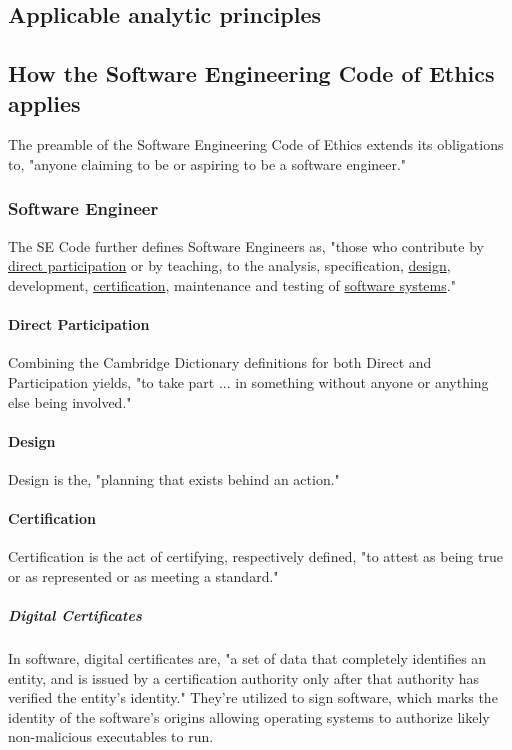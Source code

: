 \documentclass[12pt]{article}
\begin{document}
\begin{multicols}{2}
\section{Applicable analytic principles}

\subsection{How the Software Engineering Code of Ethics applies}

The preamble of the Software Engineering Code of Ethics extends its obligations to, "anyone claiming to be or aspiring to be a software engineer."\cite{softwareEngineeringCodeOfEthics}

\subsubsection{Software Engineer}

The SE Code further defines Software Engineers as, "those who contribute by \underline{direct participation} or by teaching, to the analysis, specification, \underline{design}, development, \underline{certification}, maintenance and testing of \underline{software systems}."

\paragraph{Direct Participation}

Combining the Cambridge Dictionary definitions for both Direct and Participation yields, "to take part ... in something without anyone or anything else being involved."\cite{participationDefinition}\cite{directDefinition}

\paragraph{Design}
Design is the, "planning that exists behind an action."\cite{designDefinition}

\paragraph{Certification}
Certification is the act of certifying, respectively defined, "to attest as being true or as represented or as meeting a standard."\cite{certifyingDefinition}

\subparagraph{Digital Certificates}
In software, digital certificates are, "a set of data that completely identifies an entity, and is issued by a certification authority only after that authority has verified the entity's identity."\cite{digitalCertificateDefintion} They're utilized to sign software, which marks the identity of the software's origins allowing operating systems to authorize likely non-malicious executables to run.


\end{multicols}
\end{document}
